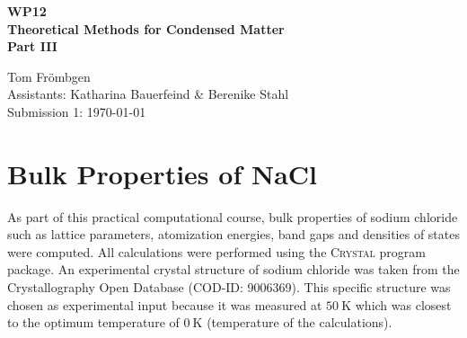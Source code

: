 \documentclass[a4paper,12pt,parskip=half]{scrartcl}
\begin{document}
%
\thispagestyle{empty}

%
\begin{center}
	\begin{LARGE}
		\vspace{50mm}
		\textbf{WP12} \\
		\vspace{15mm}
		\textbf{Theoretical Methods for Condensed Matter} \\
		\vspace{15mm}
		\textbf{Part III} \\
		\vspace{30mm}
	\end{LARGE}
	\begin{large}
		Tom Frömbgen \\
		\vspace{20mm}
		Assistants: Katharina Bauerfeind \& Berenike Stahl  \\
		\vspace{10mm}
		Submission 1: \today \\
		\vspace{5mm}
	\end{large}
\end{center}

%
%
\newpage
{}
\section{Bulk Properties of NaCl}
%
As part of this practical computational course, bulk properties of sodium chloride such as lattice parameters, atomization energies, band gaps and densities of states were computed. All calculations were performed using the \textsc{Crystal} program package.\autocite[]{crystal-1, crystal-2} An experimental crystal structure of sodium chloride was taken from the Crystallography Open Database\autocite[]{cod} (COD-ID: 9006369). This specific structure was chosen as experimental input because it was measured at $ \SI{50}{\kelvin} $ which was closest to the optimum temperature of $ \SI{0}{\kelvin} $ (temperature of the calculations).
%
\end{document}

